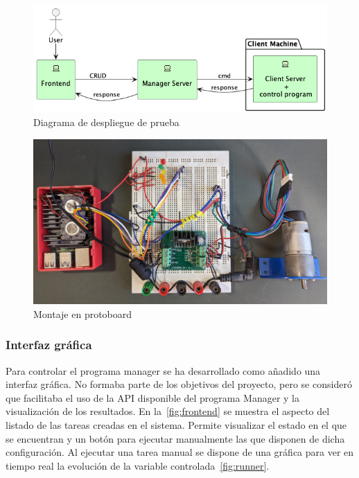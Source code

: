 \begin{figure}[H]
    \centering
    \includegraphics[height=0.2\textheight]{./part/Ejecucion/Seguimiento/PuestaAPunto/img/deploy}
    \caption{Diagrama de despliegue de prueba}\label{fig:despliegue de prueba}
\end{figure}

\begin{figure}[H]
    \centering
    \includegraphics[height=0.2\textheight]{./part/Ejecucion/Seguimiento/PuestaAPunto/img/montajeProtoboard}
    \caption{Montaje en protoboard}\label{fig:montaje en protoboard}
\end{figure}

\subsubsection{Interfaz gráfica}

Para controlar el programa manager se ha desarrollado como añadido una interfaz gráfica.
No formaba parte de los objetivos del proyecto, pero se consideró que facilitaba el uso de la API disponible del programa Manager y la visualización de los resultados.
En la~\cref{fig:frontend} se muestra el aspecto del listado de las tareas creadas en el sistema.
Permite visualizar el estado en el que se encuentran y un botón para ejecutar manualmente las que disponen de dicha configuración.
Al ejecutar una tarea manual se dispone de una gráfica para ver en tiempo real la evolución de la variable controlada~\cref{fig:runner}.

